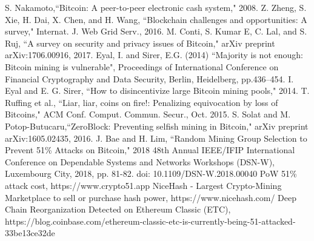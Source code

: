 \documentclass[conference]{IEEEtran}
\begin{document}
\begin{thebibliography}{00}

 S. Nakamoto,``Bitcoin: A peer-to-peer electronic cash system," 2008.
 Z. Zheng, S. Xie, H. Dai, X. Chen, and H. Wang, ``Blockchain challenges
and opportunities: A survey," Internat. J. Web Grid Serv., 2016.
M. Conti, S. Kumar E, C. Lal, and S. Ruj, ``A survey on security and privacy issues of Bitcoin," arXiv preprint arXiv:1706.00916, 2017.
 Eyal, I. and Sirer, E.G. (2014) ``Majority is not enough: Bitcoin mining is vulnerable", Proceedings
of International Conference on Financial Cryptography and Data Security, Berlin, Heidelberg,
pp.436–454.
 I. Eyal and E. G. Sirer, ``How to disincentivize large Bitcoin mining pools," 2014.
 T. Ruffing et al., “Liar, liar, coins on fire!: Penalizing equivocation by loss of Bitcoins," ACM Conf. Comput. Commun. Secur., Oct. 2015.
 S. Solat and M. Potop-Butucaru,``ZeroBlock: Preventing selfish mining in Bitcoin," arXiv preprint arXiv:1605.02435, 2016.
 J. Bae and H. Lim, ``Random Mining Group Selection to Prevent 51\% Attacks on Bitcoin," 2018 48th Annual IEEE/IFIP International Conference on Dependable Systems and Networks Workshops (DSN-W), Luxembourg City, 2018, pp. 81-82. 
doi: 10.1109/DSN-W.2018.00040
 PoW 51\% attack cost, https://www.crypto51.app
 NiceHash - Largest Crypto-Mining Marketplace to sell or purchase hash power, https://www.nicehash.com/
 Deep Chain Reorganization Detected on Ethereum Classic (ETC), https://blog.coinbase.com/ethereum-classic-etc-is-currently-being-51-attacked-33be13ce32de

\end{thebibliography}
\vspace{12pt}
\color{red}
\end{document}
